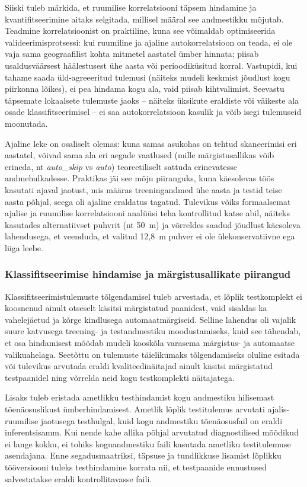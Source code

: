 Siiski tuleb märkida, et ruumilise korrelatsiooni täpsem hindamine ja kvantifitseerimine aitaks selgitada, millisel määral see andmestikku mõjutab. Teadmine korrelatsioonist on praktiline, kuna see võimaldab optimiseerida valideerimisprotsessi: kui ruumiline ja ajaline autokorrelatsioon on teada, ei ole vaja sama geograafilist kohta mitmetel aastatel ümber hinnata; piisab usaldusväärsest häälestusest ühe aasta või perioodiküsitud korral. Vastupidi, kui tahame saada üld-agreeeritud tulemusi (näiteks mudeli keskmist jõudlust kogu piirkonna lõikes), ei pea hindama kogu ala, vaid piisab kihtvalimist. Seevastu täpsemate lokaalsete tulemuste jaoks -- näiteks üksikute eraldiste või väikeste ala osade klassifitseerimisel -- ei saa autokorrelatsioon kasulik ja võib isegi tulemuseid moonutada.

Ajaline leke on osaliselt olemas: kuna samas asukohas on tehtud skaneerimisi eri aastatel, võivad sama ala eri aegade vaatlused (mille märgistusallikas võib erineda, nt \textit{auto\_skip} vs \textit{auto}) teoreetiliselt sattuda erinevatesse andmehulkadesse. Praktikas jäi see mõju piiranguks, kuna käesolevas töös kasutati ajaval jaotust, mis määras treeningandmed ühe aasta ja testid teise aasta põhjal, seega oli ajaline eraldatus tagatud. Tulevikus võiks formaalsemat ajalise ja ruumilise korrelatsiooni analüüsi teha kontrollitud katse abil, näiteks kasutades alternatiivset puhvrit (nt 50~m) ja võrreldes saadud jõudlust käesoleva lahendusega, et veenduda, et valitud 12,8~m puhver ei ole ülekonservatiivne ega liiga leebe.


\subsubsection{Klassifitseerimise hindamise ja märgistusallikate piirangud}
Klassifitseerimistulemuste tõlgendamisel tuleb arvestada, et lõplik testkomplekt ei koosnenud ainult otseselt käsitsi märgistatud paanidest, vaid sisaldas ka vahelejäetud ja kõrge kindlusega automaatmärgiseid. Selline lahendus oli vajalik suure katvusega treening- ja testandmestiku moodustamiseks, kuid see tähendab, et osa hindamisest mõõdab mudeli kooskõla varasema märgistus- ja automaatse valikuahelaga. Seetõttu on tulemuste täielikumaks tõlgendamiseks oluline esitada või tulevikus arvutada eraldi kvaliteedinäitajad ainult käsitsi märgistatud testpaanidel ning võrrelda neid kogu testkomplekti näitajatega.

Lisaks tuleb eristada ametlikku testhindamist kogu andmestiku hilisemast tõenäosuslikust ümberhindamisest. Ametlik lõplik testitulemus arvutati ajalis-ruumilise jaotusega testhulgal, kuid kogu andmestiku tõenäosusfail on eraldi inferentsisamm. Kui nende kahe allika põhjal arvutatud diagnostilised mõõdikud ei lange kokku, ei tohiks koguandmestiku faili kasutada ametliku testitulemuse asendajana. Enne segadusmaatriksi, täpsuse ja tundlikkuse lisamist lõplikku tööversiooni tuleks testhindamine korrata nii, et testpaanide ennustused salvestatakse eraldi kontrollitavasse faili.

